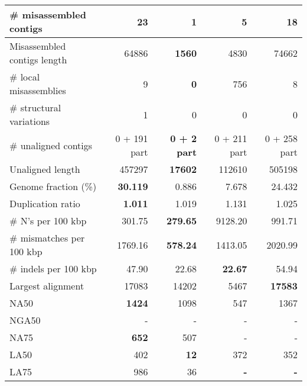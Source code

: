 \documentclass[12pt,a4paper]{article}
\begin{document}
\begin{table}[ht]
\begin{center}
\begin{tabular}{|l*{4}{|r}|}
\# misassembled contigs & 23 & {\bf 1} & 5 & 18 \\ \hline
Misassembled contigs length & 64886 & {\bf 1560} & 4830 & 74662 \\ \hline
\# local misassemblies & 9 & {\bf 0} & 756 & 8 \\ \hline
\# structural variations & 1 & 0 & 0 & 0 \\ \hline
\# unaligned contigs & 0 + 191 part & {\bf 0 + 2 part} & 0 + 211 part & 0 + 258 part \\ \hline
Unaligned length & 457297 & {\bf 17602} & 112610 & 505198 \\ \hline
Genome fraction (\%) & {\bf 30.119} & 0.886 & 7.678 & 24.432 \\ \hline
Duplication ratio & {\bf 1.011} & 1.019 & 1.131 & 1.025 \\ \hline
\# N's per 100 kbp & 301.75 & {\bf 279.65} & 9128.20 & 991.71 \\ \hline
\# mismatches per 100 kbp & 1769.16 & {\bf 578.24} & 1413.05 & 2020.99 \\ \hline
\# indels per 100 kbp & 47.90 & 22.68 & {\bf 22.67} & 54.94 \\ \hline
Largest alignment & 17083 & 14202 & 5467 & {\bf 17583} \\ \hline
NA50 & {\bf 1424} & 1098 & 547 & 1367 \\ \hline
NGA50 & - & - & - & - \\ \hline
NA75 & {\bf 652} & 507 & - & - \\ \hline
LA50 & 402 & {\bf 12} & 372 & 352 \\ \hline
LA75 & 986 & 36 & {\bf -} & {\bf -} \\ \hline
\end{tabular}
\end{center}
\end{table}
\end{document}
